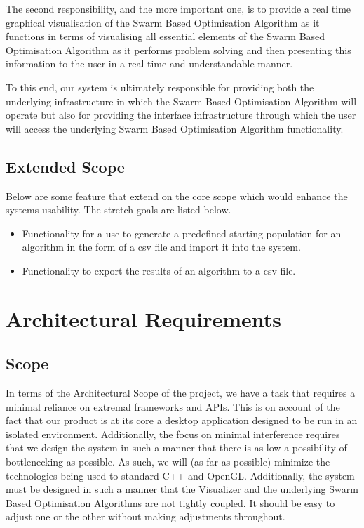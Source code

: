 \documentclass[11pt]{article}
\begin{document}
The second responsibility, and the more important one, is to provide a real time graphical visualisation of the Swarm Based Optimisation Algorithm as it functions in terms of visualising all essential elements of the Swarm Based Optimisation Algorithm as it performs problem solving and then presenting this information to the user in a real time and understandable manner.

To this end, our system is ultimately responsible for providing both the underlying infrastructure in which the Swarm Based Optimisation Algorithm will operate but also for providing the interface infrastructure through which the user will access the underlying Swarm Based Optimisation Algorithm functionality.

\subsection{Extended Scope}
Below are some feature that extend on the core scope which would enhance the systems usability. The stretch goals are listed below.
\begin{itemize}
\item Functionality for a use to generate a predefined starting population for an algorithm in the form of a csv file and import it into the system.
\item Functionality to export the results of an algorithm to a csv file.
\end{itemize}


\section{Architectural Requirements}
\subsection{Scope}
In terms of the Architectural Scope of the project, we have a task that requires a minimal reliance on extremal frameworks and APIs. This is on account of the fact that our product is at its core a desktop application designed to be run in an isolated environment. Additionally, the focus on minimal interference requires that we design the system in such a manner that there is as low a possibility of bottlenecking as possible. As such, we will (as far as possible) minimize the technologies being used to standard C++ and OpenGL. Additionally, the system must be designed in such a manner that the Visualizer and the underlying Swarm Based Optimisation Algorithms are not tightly coupled. It should be easy to adjust one or the other without making adjustments throughout.
\end{document}
